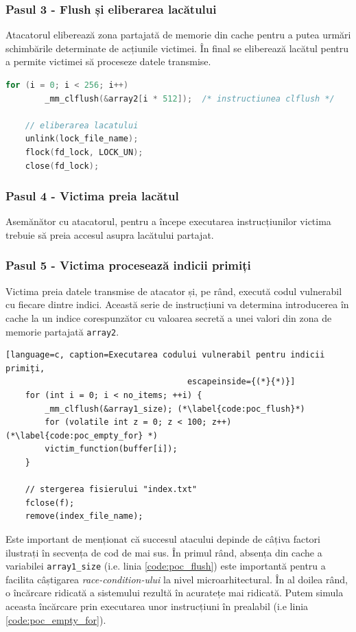 \subsubsection{Pasul 3 - Flush și eliberarea lacătului}

Atacatorul eliberează zona partajată de memorie din cache pentru a putea urmări
schimbările determinate de acțiunile victimei. În final se eliberează lacătul pentru
a permite victimei să proceseze datele transmise.

\begin{lstlisting}[language=c, caption=Flush și eliberarea datelor]
	for (i = 0; i < 256; i++)
		_mm_clflush(&array2[i * 512]);  /* instructiunea clflush */

	// eliberarea lacatului
	unlink(lock_file_name);
	flock(fd_lock, LOCK_UN);
	close(fd_lock);
\end{lstlisting}


\subsubsection{Pasul 4 - Victima preia lacătul}

Asemănător cu atacatorul, pentru a începe executarea instrucțiunilor victima trebuie
să preia accesul asupra lacătului partajat.

\subsubsection{Pasul 5 - Victima procesează indicii primiți}

Victima preia datele transmise de atacator și, pe rând, execută codul vulnerabil cu fiecare
dintre indici. Această serie de instrucțiuni va determina introducerea în cache la un indice
corespunzător cu valoarea secretă a unei valori din zona de memorie partajată \texttt{array2}.

\begin{lstlisting}[language=c, caption=Executarea codului vulnerabil pentru indicii primiți,
									 escapeinside={(*}{*)}]
	for (int i = 0; i < no_items; ++i) {
		_mm_clflush(&array1_size); (*\label{code:poc_flush}*)
		for (volatile int z = 0; z < 100; z++) (*\label{code:poc_empty_for} *)
		victim_function(buffer[i]);
	}

	// stergerea fisierului "index.txt"
	fclose(f);
	remove(index_file_name);
\end{lstlisting}

Este important de menționat că succesul atacului depinde de câțiva factori
ilustrați în secvența de cod de mai sus. În primul rând, absența din cache a
variabilei \texttt{array1\_size} (i.e. linia \ref{code:poc_flush}) este
importantă pentru a facilita câștigarea \emph{race-condition-ului} la nivel
microarhitectural. În al doilea rând, o încărcare ridicată a sistemului rezultă
în acuratețe mai ridicată. Putem simula aceasta încărcare prin executarea unor
instrucțiuni în prealabil (i.e linia \ref{code:poc_empty_for}).

